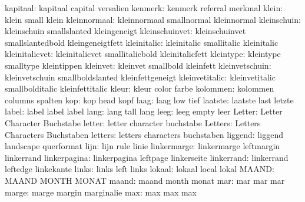            kapitaal:  kapitaal             capital             versalien
            kenmerk:  kenmerk              referral            merkmal
              klein:  klein                small               klein
       kleinnormaal:  kleinnormaal         smallnormal         kleinnormal
        kleinschuin:  kleinschuin          smallslanted        kleingeneigt
     kleinschuinvet:  kleinschuinvet       smallslantedbold    kleingeneigtfett
        kleinitalic:  kleinitalic          smallitalic         kleinitalic
     kleinitalicvet:  kleinitalicvet       smallitalicbold     kleinitalicfett
          kleintype:  kleintype            smalltype           kleintippen
           kleinvet:  kleinvet             smallbold           kleinfett
     kleinvetschuin:  kleinvetschuin       smallboldslanted    kleinfettgeneigt
     kleinvetitalic:  kleinvetitalic       smallbolditalic     kleinfettitalic
              kleur:  kleur                color               farbe
           kolommen:  kolommen             columns             spalten
                kop:  kop                  head                kopf
               laag:  laag                 low                 tief
            laatste:  laatste              last                letzte
              label:  label                label               label
               lang:  lang                 tall                lang
               leeg:  leeg                 empty               leer
             Letter:  Letter               Character           Buchstabe
             letter:  letter               character           buchstabe
            Letters:  Letters              Characters          Buchstaben
            letters:  letters              characters          buchstaben
            liggend:  liggend              landscape           querformat
               lijn:  lijn                 rule                linie
        linkermarge:  linkermarge          leftmargin          linkerrand
       linkerpagina:  linkerpagina         leftpage            linkerseite
         linkerrand:  linkerrand           leftedge            linkekante
              links:  links                left                links
             lokaal:  lokaal               local               lokal
              MAAND:  MAAND                MONTH               MONAT
              maand:  maand                month               monat
                mar:  mar                  mar                 mar
              marge:  marge                margin              marginalie
                max:  max                  max                 max
